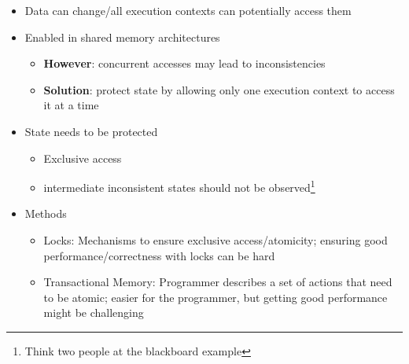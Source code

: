 \documentclass[a4paper]{article}
\begin{document}
\begin{itemize}
\begin{itemize}
\begin{itemize}
\item Data can change/all execution contexts can potentially access them
\item Enabled in shared memory architectures
\begin{itemize}
\item \textbf{However}: concurrent accesses may lead to inconsistencies
\item \textbf{Solution}: protect state by allowing only one execution context to access it at a time
\end{itemize}
\item State needs to be protected
\begin{itemize}
\item Exclusive access
\item intermediate inconsistent states should not be observed\footnote{Think two people at the blackboard example}
\end{itemize}
\item Methods
\begin{itemize}
\item Locks: Mechanisms to ensure exclusive access/atomicity; ensuring good performance/correctness with locks can be hard
\item Transactional Memory: Programmer describes a set of actions that need to be atomic; easier for the programmer, but getting good performance might be challenging
\end{itemize}
\end{itemize}
\end{itemize}
\end{itemize}
\end{document}
